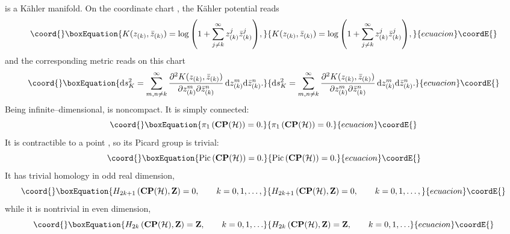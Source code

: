 \documentclass[a4paper,a4paper]{article}
\begin{document}
\coordHE{} is a K\"ahler manifold. On the coordinate chart \coordHE{}, the K\"ahler potential reads
\begin{equation}\coord{}\boxEquation{
K(z_{(k)}, {\bar z}_{(k)})=
\log{\left(1 + \sum_{j\neq k}^{\infty} z^j_{(k)} {\bar z}^j_{(k)}\right)},
\label{fubst}
}{
K(z_{(k)}, {\bar z}_{(k)})=
\log{\left(1 + \sum_{j\neq k}^{\infty} z^j_{(k)} {\bar z}^j_{(k)}\right)},
}{ecuacion}\coordE{}\end{equation} 
and the corresponding metric \coordHE{} reads on this chart
\begin{equation}\coord{}\boxEquation{
{\rm d}s^2_K = \sum_{m,n\neq k}^{\infty}{\partial^2 K(z_{(k)}, {\bar z}_{(k)})\over
\partial z_{(k)}^m \partial {\bar z}_{(k)}^n}\, {\rm d}z_{(k)}^m{\rm d}{\bar z}_{(k)}^n.
\label{rrdd}
}{
{\rm d}s^2_K = \sum_{m,n\neq k}^{\infty}{\partial^2 K(z_{(k)}, {\bar z}_{(k)})\over
\partial z_{(k)}^m \partial {\bar z}_{(k)}^n}\, {\rm d}z_{(k)}^m{\rm d}{\bar z}_{(k)}^n.
}{ecuacion}\coordE{}\end{equation}
Being infinite--dimensional, \coordHE{} is noncompact. It is simply connected:
\begin{equation}\coord{}\boxEquation{
\pi_1\left({\bf CP}({\cal H})\right)=0.
\label{cphx}
}{
\pi_1\left({\bf CP}({\cal H})\right)=0.
}{ecuacion}\coordE{}\end{equation}
It is contractible to a point \cite{KUIPER}, so its Picard group is trivial:
\begin{equation}\coord{}\boxEquation{
{\rm Pic}\, ({\bf CP}({\cal H}))=0.
\label{ppic}
}{
{\rm Pic}\, ({\bf CP}({\cal H}))=0.
}{ecuacion}\coordE{}\end{equation}
It has trivial homology in odd real dimension,
\begin{equation}\coord{}\boxEquation{
H_{2k+1}\left({\bf CP}({\cal H}), {\bf Z}\right)=0,\qquad k=0,1,\ldots,
\label{cotri}
}{
H_{2k+1}\left({\bf CP}({\cal H}), {\bf Z}\right)=0,\qquad k=0,1,\ldots,
}{ecuacion}\coordE{}\end{equation}
while it is nontrivial in even dimension,
\begin{equation}\coord{}\boxEquation{
H_{2k}\left({\bf CP}({\cal H}), {\bf Z}\right)={\bf Z}, \qquad k=0,1,\ldots
\label{pelotudo}
}{
H_{2k}\left({\bf CP}({\cal H}), {\bf Z}\right)={\bf Z}, \qquad k=0,1,\ldots
}{ecuacion}\coordE{}\end{equation}
\end{document}
